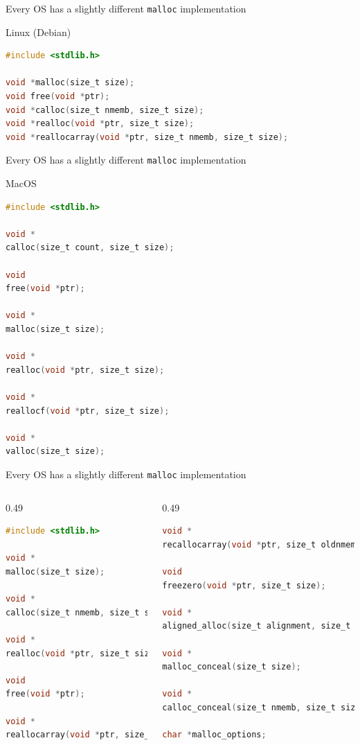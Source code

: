 \documentclass[9pt,aspectratio=169]{beamer}
\begin{document}
\begin{frame}[label={sec:orgb2e4b10},fragile]{Every OS has a slightly different \texttt{malloc} implementation}
 \begin{block}{Linux (Debian)}
\begin{lstlisting}[language=C,numbers=none]
#include <stdlib.h>

void *malloc(size_t size);
void free(void *ptr);
void *calloc(size_t nmemb, size_t size);
void *realloc(void *ptr, size_t size);
void *reallocarray(void *ptr, size_t nmemb, size_t size);
\end{lstlisting}
\end{block}
\end{frame}
\begin{frame}[label={sec:orgb15fc0e},fragile]{Every OS has a slightly different \texttt{malloc} implementation}
 \begin{block}{MacOS}
\begin{lstlisting}[language=C,numbers=none]
#include <stdlib.h>

void *
calloc(size_t count, size_t size);

void
free(void *ptr);

void *
malloc(size_t size);

void *
realloc(void *ptr, size_t size);

void *
reallocf(void *ptr, size_t size);

void *
valloc(size_t size);
\end{lstlisting}
\end{block}
\end{frame}
\begin{frame}[label={sec:orgca232fd},fragile]{Every OS has a slightly different \texttt{malloc} implementation}
 \begin{columns}
\begin{column}[t]{0.49\columnwidth}
\begin{lstlisting}[language=C,numbers=none]
#include <stdlib.h>

void *
malloc(size_t size);

void *
calloc(size_t nmemb, size_t size);

void *
realloc(void *ptr, size_t size);

void
free(void *ptr);

void *
reallocarray(void *ptr, size_t nmemb, size_t size);
\end{lstlisting}
\end{column}
\begin{column}[t]{0.49\columnwidth}
\begin{lstlisting}[language=C,numbers=none]
void *
recallocarray(void *ptr, size_t oldnmemb, size_t nmemb, size_t size);

void
freezero(void *ptr, size_t size);

void *
aligned_alloc(size_t alignment, size_t size);

void *
malloc_conceal(size_t size);

void *
calloc_conceal(size_t nmemb, size_t size);

char *malloc_options;
\end{lstlisting}
\end{column}
\end{columns}
\end{frame}
\end{document}
